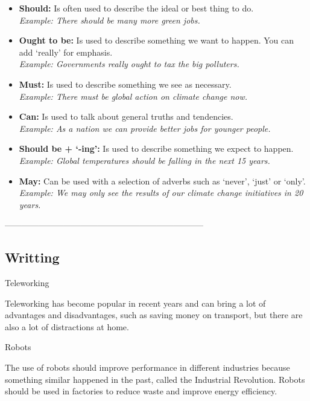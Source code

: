 \begin{itemize}
    \item \textbf{Should:} Is often used to describe the ideal or best thing to do. \\
    \textit{Example: There should be many more green jobs.}
    \item \textbf{Ought to be:} Is used to describe something we want to happen. You can add `really' for emphasis. \\
    \textit{Example: Governments really ought to tax the big polluters.}
    \item \textbf{Must:} Is used to describe something we see as necessary. \\
    \textit{Example: There must be global action on climate change now.}
    \item \textbf{Can:} Is used to talk about general truths and tendencies. \\
    \textit{Example: As a nation we can provide better jobs for younger people.}
    \item \textbf{Should be + `-ing':} Is used to describe something we expect to happen. \\
    \textit{Example: Global temperatures should be falling in the next 15 years.}
    \item \textbf{May:} Can be used with a selection of adverbs such as `never', `just' or `only'. \\
    \textit{Example: We may only see the results of our climate change initiatives in 20 years.}
\end{itemize}



-----------------------------------------------------------------------


\subsection{Writting}


Teleworking

Teleworking has become popular in recent years and can bring a lot of advantages and disadvantages, such as saving money on transport, but there are also a lot of distractions at home.


Robots

The use of robots should improve performance in different industries because something similar happened in the past, called the Industrial Revolution. Robots should be used in factories to reduce waste and improve energy efficiency.


